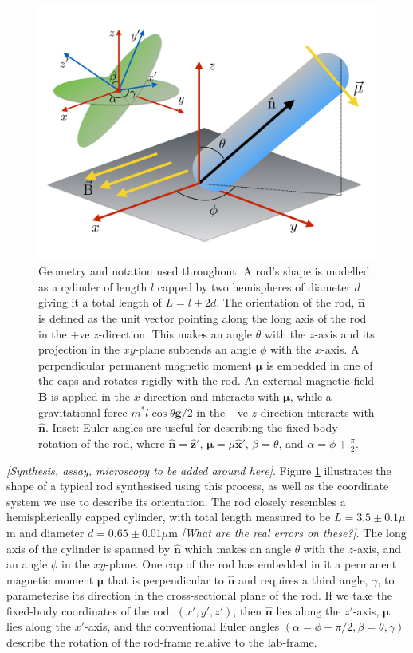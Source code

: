 \documentclass[aps,prl,twocolumn,superscriptaddress]{revtex4-1}
\newcommand{\vcrm}[1]{\mathbf{#1}}
\newcommand{\hvcrm}[1]{\mathbf{\hat{#1}}}
\newcommand{\vc}[1]{\boldsymbol{#1}}
\begin{document}
\begin{figure}
	\includegraphics[width=0.98\columnwidth]{figs/geometry.pdf}
	\caption{\footnotesize Geometry and notation used throughout. A rod's shape is modelled as a cylinder of length $l$ capped by two hemispheres of diameter $d$ giving it a total length of $L=l+2d$. The orientation of the rod, $\hvcrm{n}$ is defined as the unit vector pointing along the long axis of the rod in the $+$ve $z$-direction. This makes an angle $\theta$ with the $z$-axis and its projection in the $xy$-plane subtends an angle $\phi$ with the $x$-axis. A perpendicular permanent magnetic moment $\vc{\mu}$ is embedded in one of the caps and rotates rigidly with the rod. An external magnetic field $\vcrm{B}$ is applied in the $x$-direction and interacts with $\vc{\mu}$, while a gravitational force $m^*l\cos\theta\vcrm{g}/2$ in the $-$ve $z$-direction interacts with $\hvcrm{n}$. Inset: Euler angles are useful for describing the fixed-body rotation of the rod, where $\hvcrm{n}=\hvcrm{z}'$, $\vc{\mu}=\mu\hvcrm{x}'$, $\beta=\theta$, and $\alpha=\phi+\frac{\pi}{2}$.\label{fig:geometry}}
\end{figure}

\emph{[Synthesis, assay, microscopy to be added around here]}. Figure \ref{fig:geometry} illustrates the shape of a typical rod synthesised using this process, as well as the coordinate system we use to describe its orientation. The rod closely resembles a hemispherically capped cylinder, with total length measured to be $L=3.5\pm0.1 \mu$m and diameter $d = 0.65\pm0.01 \mu$m \emph{[What are the real errors on these?]}. The long axis of the cylinder is spanned by $\hvcrm{n}$ which makes an angle $\theta$ with the $z$-axis, and an angle $\phi$ in the $xy$-plane. One cap of the rod has embedded in it a permanent magnetic moment $\vc{\mu}$ that is perpendicular to $\hvcrm{n}$ and requires a third angle, $\gamma$, to parameterise its direction in the cross-sectional plane of the rod. If we take the fixed-body coordinates of the rod, $(x',y',z')$, then $\hvcrm{n}$ lies along the $z'$-axis, $\vc{\mu}$ lies along the $x'$-axis, and the conventional Euler angles $(\alpha=\phi+\pi/2, \beta=\theta, \gamma)$ describe the rotation of the rod-frame relative to the lab-frame. 
\end{document}
